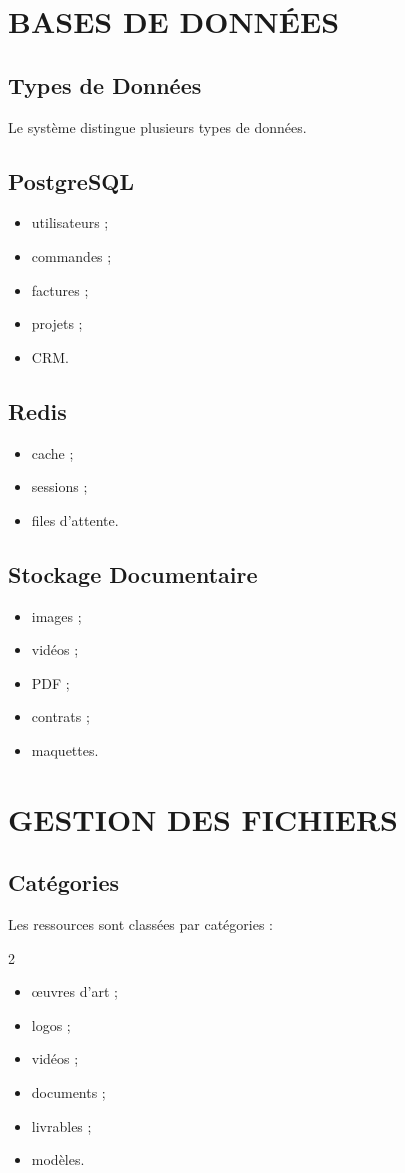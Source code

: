 \documentclass[12pt,a4paper,oneside]{book}
\begin{document}
\chapter{BASES DE DONNÉES}

\section{Types de Données}
Le système distingue plusieurs types de données.

\section{PostgreSQL}
\begin{itemize}
\item utilisateurs ;
\item commandes ;
\item factures ;
\item projets ;
\item CRM.
\end{itemize}

\section{Redis}
\begin{itemize}
\item cache ;
\item sessions ;
\item files d'attente.
\end{itemize}

\section{Stockage Documentaire}
\begin{itemize}
\item images ;
\item vidéos ;
\item PDF ;
\item contrats ;
\item maquettes.
\end{itemize}

\chapter{GESTION DES FICHIERS}

\section{Catégories}
Les ressources sont classées par catégories :
\begin{multicols}{2}
\begin{itemize}
\item œuvres d'art ;
\item logos ;
\item vidéos ;
\item documents ;
\item livrables ;
\item modèles.
\end{itemize}
\end{multicols}
\end{document}
